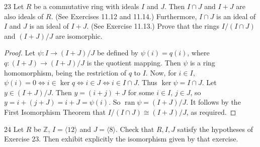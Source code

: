 \begin{problem}{23}
Let $R$ be a commutative ring with ideals $I$ and $J$. Then $I \cap J$ and $I + J$ are also ideals of $R$. (See Exercises 11.12 and 11.14.) Furthermore, $I \cap J$ is an ideal of $I$ and $J$ is an ideal of $I + J$. (See Exercise 11.13.) Prove that the rings $I/(I \cap J)$ and $(I + J)/J$ are isomorphic.
\end{problem}
\solved

\begin{proof}
    Let $\psi : I \longrightarrow (I + J)/J$ be defined by $\psi(i) = q(i)$,
    where $q : (I + J) \longrightarrow (I + J)/J$ is the quotient mapping.
    Then $\psi$ is a ring homomorphism, being the restriction of $q$ to $I$.
    Now, for $i \in I$,
    $\psi(i) = 0 \iff i \in \ker q \iff i \in J \iff i \in I \cap J$.
    Thus $\ker \psi = I \cap J$.
    Let $y \in (I + J)/J$. Then $y = (i + j) + J$ for some $i \in I$, $j \in J$,
    so $y = i + (j + J) = i + J = \psi(i)$.
    So $\operatorname{ran} \psi = (I + J)/J$. It follows by the First Isomorphism Theorem that
    $I/(I \cap J) \cong (I + J)/J$, as required.
\end{proof}

\begin{problem}{24}
    Let $R$ be $\mathbb{Z}$, $I = \langle 12 \rangle$ and $J = \langle 8 \rangle$. Check
    that $R, I, J$ satisfy the hypotheses of Exercise 23. Then exhibit explicitly the
    isomorphism given by that exercise.
\end{problem}
\unsolved
